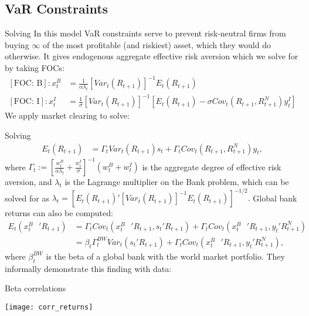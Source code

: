 \documentclass{beamer}
\begin{document}
\subsection{VaR Constraints}
\begin{frame}{Solving}
In this model VaR constraints serve to prevent risk-neutral firms from buying $\infty$ of the most profitable (and riskiest) asset, which they would do otherwise. It gives endogenous aggregate effective risk aversion which we solve for by taking FOCs:
\begin{align*}
\left[\text{FOC: B}\right]:  x_t^B &= \frac{1}{\alpha \lambda_t}\left[ Var_t(R_{t+1})\right]^{-1}E_t(R_{t+1}) \\
\left[\text{FOC: I}\right]:  x_t^I &= \frac{1}{\sigma}\left[ Var_t(R_{t+1})\right]^{-1}[E_t(R_{t+1}) - \sigma Cov_t(R_{t+1},R^N_{t+1})y_t^I]
\end{align*}
We apply market clearing to solve:
\end{frame}
\begin{frame}{Solving}
\begin{align*}
E_t(R_{t+1}) &= \Gamma_t Var_t(R_{t+1})s_t + \Gamma_tCov_t(R_{t+1},R_{t+1}^N)y_t,
\end{align*}
where $\Gamma_t := \left[ \frac{w_t^B}{\alpha \lambda_t} + \frac{w_t^I}{\sigma}\right]^{-1}(w_t^B + w_t^I)$ is the aggregate degree of effective risk aversion, and $\lambda_t$ is the Lagrange multiplier on the Bank problem, which can be solved for as $\lambda_t = \left[E_t(R_{t+1})'[Var_t(R_{t+1})]^{-1}E_t(R_{t+1}) \right]^{-1/2}.$ Global bank returns can also be computed:
\begin{align*}
E_t(x_t^{B} \text{ }'R_{t+1}) &= \Gamma_t Cov_t(x_t^B \text{ }'R_{t+1},s_t' R_{t+1}) + \Gamma_t Cov_t(x_t^B \text{ }'R_{t+1},y_t' R^N_{t+1}) \\
&= \beta_t \Gamma_t^{BW} Var_t(s_t' R_{t+1}) + \Gamma_t Cov_t(x_t^B \text{ }'R_{t+1},y_t' R^N_{t+1}),
\end{align*}
where $\beta_t^{BW}$ is the beta of a global bank with the world market portfolio. They informally demonstrate this finding with data:
\end{frame}
\begin{frame}{Beta correlations}
\begin{center}
\texttt{[image: corr\_returns]}
\end{center}
\end{frame}
\end{document}
